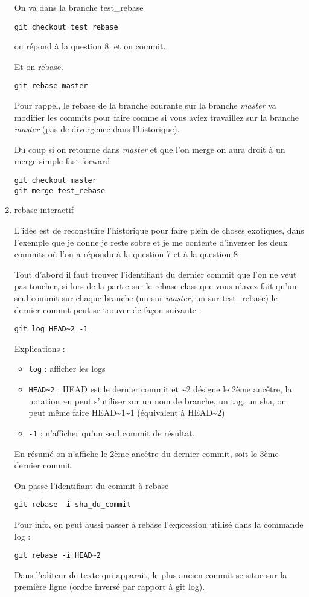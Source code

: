 \documentclass[10pt]{exam}
\begin{document}
\begin{questions}
\begin{enumerate}
On va dans la branche test\_rebase
\begin{lstlisting}
git checkout test_rebase
\end{lstlisting}
on répond à la question 8, et on commit.

Et on rebase.
\begin{lstlisting}
git rebase master
\end{lstlisting}
Pour rappel, le rebase de la branche courante sur la branche \emph{master} va modifier les commits pour faire comme si vous aviez travaillez sur la branche \emph{master} (pas de divergence dans l'historique).

Du coup si on retourne dans \emph{master} et que l'on merge on aura droit à un merge simple fast-forward
\begin{lstlisting}
git checkout master
git merge test_rebase
\end{lstlisting}

\item rebase interactif

L'idée est de reconstuire l'historique pour faire plein de choses exotiques, dans l'exemple que je donne je reste sobre et je me contente d'inverser les deux commits où l'on a répondu à la question 7 et à la question 8

Tout d'abord il faut trouver l'identifiant du dernier commit que l'on ne veut pas toucher, si lors de la partie sur le rebase classique vous n'avez fait qu'un seul commit sur chaque branche (un sur \emph{master,} un sur test\_rebase) le dernier commit peut se trouver de façon suivante :
\begin{lstlisting}
git log HEAD~2 -1
\end{lstlisting}

Explications :
\begin{itemize}
\item \texttt{log} : afficher les logs
\item \texttt{HEAD\~{}2} : HEAD est le dernier commit et \~{}2 désigne le 2ème ancêtre, la notation \~{}n peut s'utiliser sur un nom de branche, un tag, un sha, on peut même faire HEAD\~{}1\~{}1 (équivalent à HEAD\~{}2)
\item \texttt{-1} : n'afficher qu'un seul commit de résultat.
\end{itemize}
En résumé on n'affiche le 2ème ancêtre du dernier commit, soit le 3ème dernier commit.

On passe l'identifiant du commit à rebase

\begin{lstlisting}
git rebase -i sha_du_commit
\end{lstlisting}
Pour info, on peut aussi passer à rebase l'expression utilisé dans la commande log :
\begin{lstlisting}
git rebase -i HEAD~2
\end{lstlisting}
Dans l'editeur de texte qui apparait, le plus ancien commit se situe sur la première ligne (ordre inversé par rapport à git log).


\end{enumerate}
\end{questions}
\end{document}
